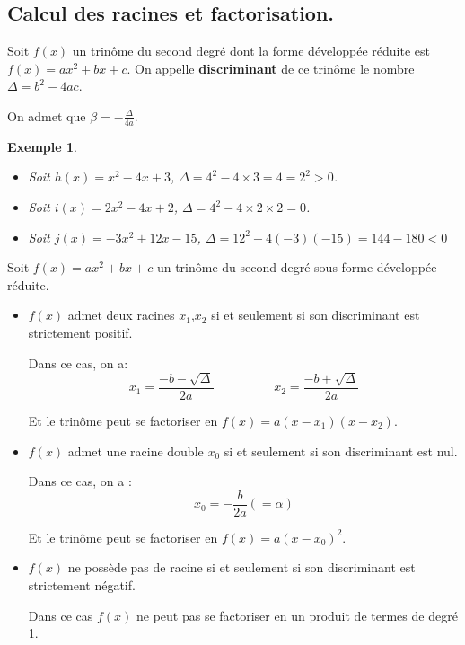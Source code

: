 \documentclass[a4paper,11pt]{article}
\theoremstyle{break}
\newtheorem{exemple}{Exemple}
\begin{document}
  \subsection{Calcul des racines et factorisation.}
  
  \begin{Def}[Discriminant]
    Soit $f(x)$ un trinôme du second degré dont la forme développée réduite
    est $f(x)=ax^2+bx+c$. On appelle \textbf{discriminant} de ce trinôme
    le nombre $\Delta=b^2-4ac$.
    
    On admet que $\beta=-\frac{\Delta}{4a}$.
  \end{Def}
  
  \begin{exemple}
    \begin{itemize}
     \item Soit $h(x)=x^2-4x+3$, $\Delta=4^2-4 \times 3=4=2^2>0$.
     \item Soit $i(x)=2x^2-4x+2$, $\Delta=4^2-4 \times 2 \times 2=0$.
     \item Soit $j(x)=-3x^2+12x-15$, $\Delta=12^2-4(-3)(-15)=144-180<0$
    \end{itemize}
   \end{exemple}
  
  \begin{theorem}[Central]
    Soit $f(x)=ax^2+bx+c$ un trinôme du second degré sous forme développée réduite.
    \begin{itemize}
     \item  $f(x)$ admet deux racines $x_1$,$x_2$ si et seulement si 
     son discriminant est strictement positif.
     
     Dans ce cas, on a:
     $$x_1=\frac{-b-\sqrt{\Delta}}{2a} \hspace{2cm} x_2=\frac{-b+\sqrt{\Delta}}{2a}$$
     
     Et le trinôme peut se factoriser en $f(x)=a(x-x_1)(x-x_2)$.
     
     \item $f(x)$ admet une racine double $x_0$ si et seulement si
     son discriminant est nul.
     
     Dans ce cas, on a :
     $$x_0=-\frac{b}{2a}(=\alpha)$$
     
     Et le trinôme peut se factoriser en $f(x)=a(x-x_0)^2$.
     
     \item $f(x)$ ne possède pas de racine si et seulement si son discriminant
     est strictement négatif.
     
     Dans ce cas $f(x)$ ne peut pas se factoriser en un produit de termes de degré 1.
    \end{itemize}    
  \end{theorem}
  
\end{document}
